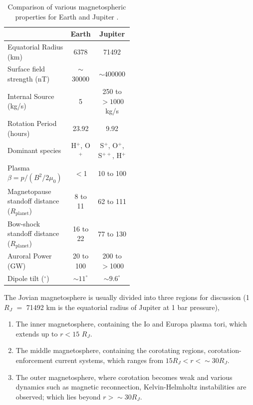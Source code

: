 \begin{table}
    \centering
    \begin{tabular}{p{0.5\linewidth}|c|c}
        &\textbf{Earth}  &\textbf{Jupiter}\\
    \hline
    Equatorial Radius (km) &6378    &71492\\
    Surface field strength (nT)  &$\sim$30000   &$\sim400000$\\
    Internal Source (kg/s)          &5   &250 to $>1000$ kg/s\\
    Rotation Period (hours)         &23.92   &9.92\\
    Dominant species                &H$^+$, O$^+$   &S$^+$, O$^+$, S$^{++}$, H$^+$\\
    Plasma $\beta=p/(B^2/2\mu_0)$   &$<$1 &10 to 100\\
    Magnetopause standoff distance ($R_\text{planet}$)    &8 to 11   &62 to 111\\
    Bow-shock standoff distance ($R_\text{planet}$)   &16 to 22  &77 to 130\\
    Auroral Power (GW)              &20 to 100   &200 to $>$1000\\
    Dipole tilt ($^\circ$)  &$\sim11^\circ$   &$\sim9.6^\circ$\\
    \end{tabular}
    \caption{Comparison of various magnetospheric properties for Earth and Jupiter \protect\cite{Shue1998MagnetopauseConditions,Cairns1996MagneticShock,Khurana2004a, Krupp2004DynamicsMagnetosphere,Clarke2009,Krupp2016ComparisonMagnetospheres,Bagenal2013PlanetaryMagnetospheres}.}
    \label{tab:earth-jupiter-scales}
\end{table}

The Jovian magnetosphere is usually divided into three regions for discussion (1 $R_J$ $=$ 71492 km is the equatorial radius of Jupiter at 1 bar pressure), 

\begin{enumerate}
    \item The inner magnetosphere, containing the Io and Europa plasma tori, which extends up to $r < 15$ $R_J$.
    \item The middle magnetosphere, containing the corotating regions, corotation-enforcement current systems, which ranges from $15 R_J < r < \sim30 R_J$.
    \item The outer magnetosphere, where corotation becomes weak and various dynamics such as magnetic reconnection, Kelvin-Helmholtz instabilities are observed; which lies beyond $r > \sim30 R_J$. 
\end{enumerate}

